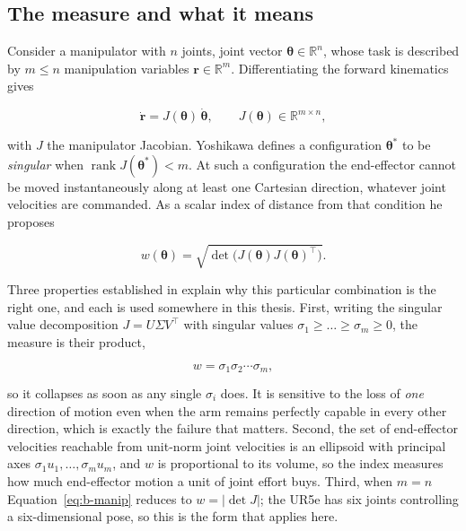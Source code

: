 \subsection{The measure and what it means}

Consider a manipulator with \(n\) joints, joint vector
\(\boldsymbol{\theta}\in\mathbb{R}^{n}\), whose task is described by \(m\le n\) manipulation
variables \(\mathbf{r}\in\mathbb{R}^{m}\). Differentiating the forward kinematics gives

\begin{equation}\label{eq:b-jacobian}
\dot{\mathbf{r}}=J(\boldsymbol{\theta})\,\dot{\boldsymbol{\theta}},
\qquad J(\boldsymbol{\theta})\in\mathbb{R}^{m\times n},
\end{equation}

with \(J\) the manipulator Jacobian. Yoshikawa \cite{yoshikawa1985manipulability} defines a
configuration \(\boldsymbol{\theta}^{*}\) to be \emph{singular} when
\(\operatorname{rank}J(\boldsymbol{\theta}^{*})<m\). At such a configuration the end-effector
cannot be moved instantaneously along at least one Cartesian direction, whatever joint velocities
are commanded. As a scalar index of distance from that condition he proposes

\begin{equation}\label{eq:b-manip}
w(\boldsymbol{\theta})=\sqrt{\det\bigl(J(\boldsymbol{\theta})J(\boldsymbol{\theta})^{\top}\bigr)} .
\end{equation}

Three properties established in \cite{yoshikawa1985manipulability} explain why this particular
combination is the right one, and each is used somewhere in this thesis. First, writing the
singular value decomposition \(J=U\Sigma V^{\top}\) with singular values
\(\sigma_{1}\ge\dots\ge\sigma_{m}\ge0\), the measure is their product,

\begin{equation}\label{eq:b-svd}
w=\sigma_{1}\sigma_{2}\cdots\sigma_{m},
\end{equation}

so it collapses as soon as any single \(\sigma_{i}\) does. It is sensitive to the loss of
\emph{one} direction of motion even when the arm remains perfectly capable in every other
direction, which is exactly the failure that matters. Second, the set of end-effector velocities
reachable from unit-norm joint velocities is an ellipsoid with principal axes
\(\sigma_{1}u_{1},\dots,\sigma_{m}u_{m}\), and \(w\) is proportional to its volume, so the index
measures how much end-effector motion a unit of joint effort buys. Third, when \(m=n\)
Equation~\eqref{eq:b-manip} reduces to \(w=\lvert\det J\rvert\); the UR5e has six joints
controlling a six-dimensional pose, so this is the form that applies here.

